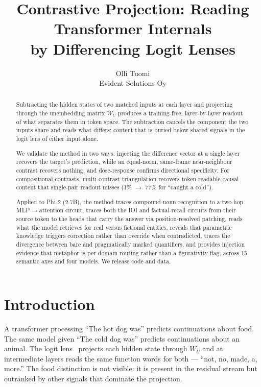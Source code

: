 \documentclass[11pt]{article}
\title{Contrastive Projection: Reading Transformer Internals\\ by Differencing Logit Lenses}
\author{Olli Tuomi\\ Evident Solutions Oy}
\date{}
\newcommand{\WU}{W_U}
\begin{document}
\maketitle

\begin{abstract}
Subtracting the hidden states of two matched inputs at each layer and
projecting through the unembedding matrix $\WU$ produces a training-free,
layer-by-layer readout of what separates them in token space. The
subtraction cancels the component the two inputs share and reads what
differs: content that is buried below shared signals in the logit lens
of either input alone.

We validate the method in two ways: injecting the difference vector at
a single layer recovers the target's prediction, while an equal-norm,
same-frame near-neighbour contrast recovers nothing, and dose-response
confirms directional specificity. For
compositional contrasts, multi-contrast triangulation recovers token-readable
causal content that single-pair readout misses (1\% $\rightarrow$ 77\% for ``caught a
cold'').

Applied to Phi-2 (2.7B), the method traces compound-noun recognition to a
two-hop MLP$\rightarrow$attention circuit, traces both the IOI and factual-recall circuits
from their source token to the heads that carry the answer via position-resolved patching,
reads what the model retrieves for real versus fictional entities, reveals
that parametric knowledge triggers correction rather than override when
contradicted, traces the divergence between bare and pragmatically marked
quantifiers, and provides injection evidence that metaphor is per-domain
routing rather than a figurativity flag, across 15 semantic axes and four
models. We release code and data.
\end{abstract}

\section{Introduction}

A transformer processing ``The hot dog was'' predicts continuations about food.
The same model given ``The cold dog was'' predicts continuations about an
animal. The logit lens~\citep{nostalgebraist2020} projects each hidden state through
$\WU$ and at intermediate layers reads the same function words for both ---
``not, no, made, a, more.'' The food distinction is not visible: it is present in
the residual stream but outranked by other signals that dominate the
projection.
\end{document}
